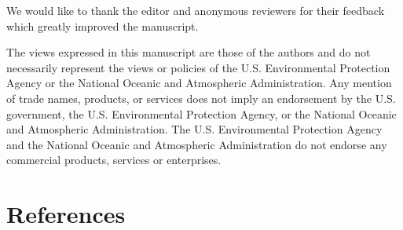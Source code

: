 \documentclass[10pt,letterpaper]{article}
\begin{document}
We would like to thank the editor and anonymous reviewers for their
feedback which greatly improved the manuscript.

The views expressed in this manuscript are those of the authors and do
not necessarily represent the views or policies of the U.S.
Environmental Protection Agency or the National Oceanic and Atmospheric
Administration. Any mention of trade names, products, or services does
not imply an endorsement by the U.S. government, the U.S. Environmental
Protection Agency, or the National Oceanic and Atmospheric
Administration. The U.S. Environmental Protection Agency and the
National Oceanic and Atmospheric Administration do not endorse any
commercial products, services or enterprises.

\hypertarget{references}{%
\section*{References}\label{references}}
\end{document}
